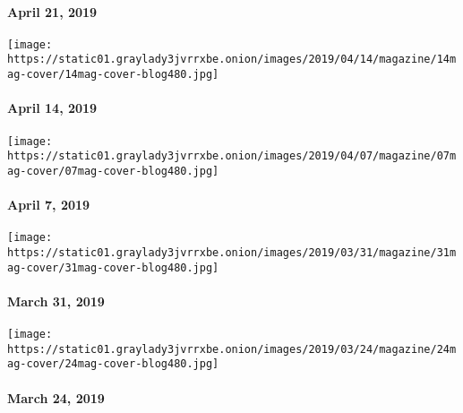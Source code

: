 \hypertarget{april-21-2019}{%
\paragraph{April 21, 2019}\label{april-21-2019}}

\href{https://www.nytimes3xbfgragh.onion/issue/magazine/2019/04/12/the-41419-issue}{}

\texttt{[image: https://static01.graylady3jvrrxbe.onion/images/2019/04/14/magazine/14mag-cover/14mag-cover-blog480.jpg]}

\hypertarget{april-14-2019}{%
\paragraph{April 14, 2019}\label{april-14-2019}}

\href{https://www.nytimes3xbfgragh.onion/issue/magazine/2019/04/06/the-4719-issue}{}

\texttt{[image: https://static01.graylady3jvrrxbe.onion/images/2019/04/07/magazine/07mag-cover/07mag-cover-blog480.jpg]}

\hypertarget{april-7-2019}{%
\paragraph{April 7, 2019}\label{april-7-2019}}

\href{https://www.nytimes3xbfgragh.onion/issue/magazine/2019/03/29/the-33119-issue}{}

\texttt{[image: https://static01.graylady3jvrrxbe.onion/images/2019/03/31/magazine/31mag-cover/31mag-cover-blog480.jpg]}

\hypertarget{march-31-2019}{%
\paragraph{March 31, 2019}\label{march-31-2019}}

\href{https://www.nytimes3xbfgragh.onion/issue/magazine/2019/03/22/the-032419-issue}{}

\texttt{[image: https://static01.graylady3jvrrxbe.onion/images/2019/03/24/magazine/24mag-cover/24mag-cover-blog480.jpg]}

\hypertarget{march-24-2019}{%
\paragraph{March 24, 2019}\label{march-24-2019}}

\href{https://www.nytimes3xbfgragh.onion/issue/magazine/2019/03/15/the-31719-issue}{}

